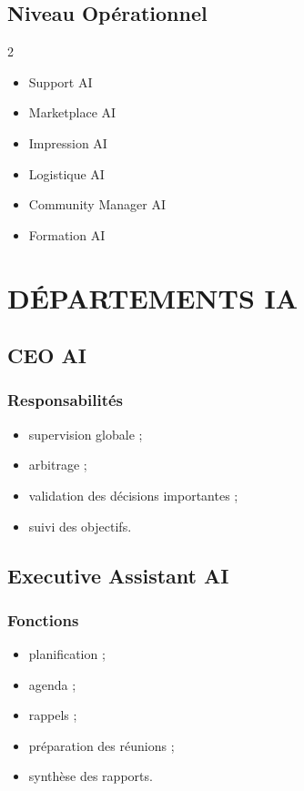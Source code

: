 \documentclass[12pt,a4paper,oneside]{book}
\begin{document}
\section{Niveau Opérationnel}
\begin{multicols}{2}
\begin{itemize}
\item Support AI
\item Marketplace AI
\item Impression AI
\item Logistique AI
\item Community Manager AI
\item Formation AI
\end{itemize}
\end{multicols}

\chapter{DÉPARTEMENTS IA}

\section{CEO AI}
\subsection{Responsabilités}
\begin{itemize}
\item supervision globale ;
\item arbitrage ;
\item validation des décisions importantes ;
\item suivi des objectifs.
\end{itemize}

\section{Executive Assistant AI}
\subsection{Fonctions}
\begin{itemize}
\item planification ;
\item agenda ;
\item rappels ;
\item préparation des réunions ;
\item synthèse des rapports.
\end{itemize}
\end{document}
